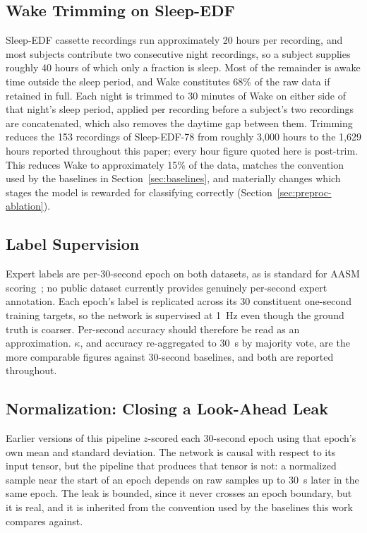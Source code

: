 \documentclass[conference]{IEEEtran}
\begin{document}
\subsection{Wake Trimming on Sleep-EDF}

Sleep-EDF cassette recordings run approximately 20 hours per recording, and most subjects
contribute two consecutive night recordings, so a subject supplies roughly 40 hours of which only a
fraction is sleep. Most of the remainder is awake time outside the sleep period, and Wake
constitutes 68\% of the raw data if retained in full. Each night is trimmed to 30 minutes of Wake on
either side of that night's sleep period, applied per recording before a subject's two recordings
are concatenated, which also removes the daytime gap between them. Trimming reduces the 153
recordings of Sleep-EDF-78 from roughly 3{,}000 hours to the 1{,}629 hours reported throughout this
paper; every hour figure quoted here is post-trim. This reduces Wake to approximately 15\% of the
data, matches the convention used by the baselines in Section~\ref{sec:baselines}, and materially
changes which stages the model is rewarded for classifying correctly
(Section~\ref{sec:preproc-ablation}).

\subsection{Label Supervision}

Expert labels are per-30-second epoch on both datasets, as is standard for AASM
scoring~\cite{aasm}; no public dataset currently provides genuinely per-second expert annotation.
Each epoch's label is replicated across its 30 constituent one-second training targets, so the
network is supervised at 1~Hz even though the ground truth is coarser. Per-second accuracy should
therefore be read as an approximation. $\kappa$, and accuracy re-aggregated to 30~s by majority
vote, are the more comparable figures against 30-second baselines, and both are reported throughout.

\sloppy
\subsection{Normalization: Closing a Look-Ahead Leak}
\label{sec:norm}

Earlier versions of this pipeline $z$-scored each 30-second epoch using that epoch's own mean and
standard deviation. The network is causal with respect to its input tensor, but the pipeline that
produces that tensor is not: a normalized sample near the start of an epoch depends on raw samples
up to 30~s later in the same epoch. The leak is bounded, since it never crosses an epoch boundary,
but it is real, and it is inherited from the convention used by the baselines this work compares
against.
\end{document}
